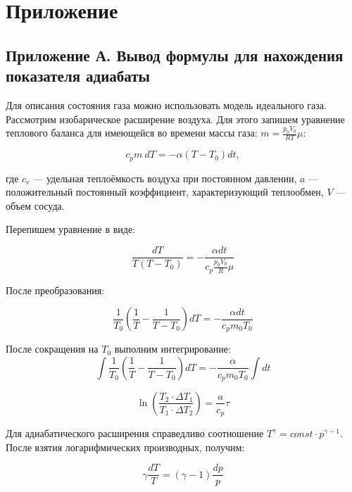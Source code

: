\chapter{Приложение}
\label{ch:appendix}

\section {Приложение А. Вывод формулы для нахождения показателя адиабаты}

Для описания состояния газа можно использовать модель идеального
газа. Рассмотрим изобарическое расширение воздуха. Для этого запишем уравнение теплового баланса для имеющейся во времени массы газа: $m = \frac{p_0V_0}{RT}\mu$:

\begin{equation}
    c_p m \ dT = -\alpha (T - T_0) dt, 
\end{equation}

где $c_v$ — удельная теплоёмкость воздуха при постоянном давлении, $a$ — положительный постоянный коэффициент, характеризующий теплообмен, $V$ — объем сосуда.

Перепишем уравнение в виде:

\begin{equation}
    \frac{dT}{T(T - T_0)} = -\frac{\alpha dt}{c_p \frac{p_0V_0}{R}\mu} 
\end{equation}

После преобразования:

\begin{equation}
    \frac{1}{T_0} \left(\frac{1}{T} -\frac{1}{T - T_0} \right)dT = -\frac{\alpha dt}{c_p m_0T_0} 
\end{equation}

После сокращения на $T_0 $ выполним интегрирование:
\begin{equation}
    \int \frac{1}{T_0} \left(\frac{1}{T} -\frac{1}{T - T_0} \right)dT = -\frac{\alpha}{c_p m_0T_0} \int dt
\end{equation}

\begin{equation}
    \ln \left( \frac{T_2 \cdot \Delta T_1}{T_1 \cdot \Delta T_2} \right) =  \frac{a}{c_p} \tau
\end{equation}

Для адиабатического расширения справедливо соотношение $T^{\gamma} = const \cdot p^{\gamma-1}$. После взятия логарифмических производных, получим:

\begin{equation}
    \gamma \frac{dT}{T} = (\gamma - 1) \frac{dp}{p}
\end{equation}

